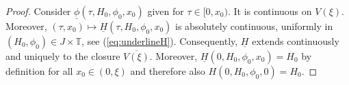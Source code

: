 \documentclass[reqno,12pt]{amsart}
\newcommand{\note}[1]{\vspace{5 mm}\par \noindent
\marginpar{\textsc{Note}} \framebox{\begin{minipage}[c]{0.95
\textwidth} \flushleft \tt #1 \end{minipage}}\vspace{5 mm}\par}
\newcommand{\eqlab}[1]{\label{eq:#1}}
\renewcommand{\eqref}[1]{(\ref{eq:#1})}
\numberwithin{equation}{section}
\begin{document}
 \begin{proof}
   Consider $\underline \phi(\tau,H_0,\phi_0,x_0)$ given for $\tau\in [0,x_0)$. It is continuous on $V(\xi)$. %
Moreover,
$(\tau,x_0)\mapsto \underline H(\tau ,H_0,\phi_0,x_0)$ is absolutely continuous, uniformly in $(H_0,\phi_0)\in J\times \mathbb T$, see \eqref{underlineH}. Consequently, $\underline H$ extends continuously and uniquely to the closure  $\overline{V(\xi)}$. Moreover, $\underline H(0,H_0,\phi_0,x_0)=H_0$ by definition for all $x_0\in (0,\xi)$ and therefore also $H(0,H_0,\phi_0,0)=H_0$.%
 \end{proof}
\end{document}
